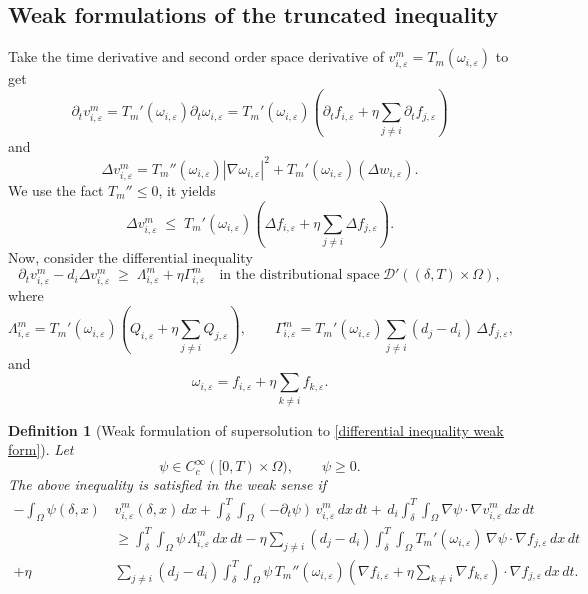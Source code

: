 \documentclass[a4paper,12pt,reqno]{amsart}
\theoremstyle{plain}
\newtheorem{defn}[thm]{Definition}
\numberwithin{equation}{section}
\begin{document}
	\subsection{Weak formulations of the truncated inequality}
	Take the time derivative and second order space derivative of $	v^m_{i,\varepsilon} = T_m(\omega_{i,\varepsilon})$ to get 
	\[
	\partial_t v^m_{i,\varepsilon}=
	T_m'(\omega_{i,\varepsilon}) \partial_t \omega_{i,\varepsilon}
	= T_m'(\omega_{i,\varepsilon})
	\left( 
	\partial_t f_{i,\varepsilon}
	+ \eta \sum_{j\ne i} \partial_t f_{j,\varepsilon}
	\right)
	\]
	and
	\[
	\Delta v^m_{i,\varepsilon}
	= T_m''(\omega_{i,\varepsilon})
	\left| 
	\nabla \omega_{i,\varepsilon}
	\right|^2
	+ T_m'(\omega_{i,\varepsilon})
	\left( 
	\Delta w_{i,\varepsilon}
	\right).
	\]
	We use the fact $T_m''\le 0$, it yields
	\[
	\Delta v^m_{i,\varepsilon}
	\;\le\;
	T_m'(\omega_{i,\varepsilon})
	\left( 
	\Delta f_{i,\varepsilon}
	+ \eta \sum_{j\ne i} \Delta f_{j,\varepsilon}
	\right).
	\]
	Now, consider the differential inequality
	\[
	\partial_t v^m_{i,\varepsilon}
	- d_i \Delta v^m_{i,\varepsilon}
	\;\ge\;
	\Lambda^m_{i,\varepsilon}
	+
	\eta\Gamma^m_{i,\varepsilon}
	\quad \text{in the distributional space}\  \mathcal{D}'((\delta,T)\times\Omega),
	\]
	where
	\[
	\Lambda^m_{i,\varepsilon}
	=
	T_m'(\omega_{i,\varepsilon})
	\left(
	Q_{i,\varepsilon}
	+ \eta \sum_{j\ne i} Q_{j,\varepsilon}
	\right),
	\qquad
	\Gamma^{m}_{i,\varepsilon}
	=
	T_m'(\omega_{i,\varepsilon})
	\sum_{j\ne i} (d_j - d_i)\, \Delta f_{j,\varepsilon},
	\]
	and
	\[
	\omega_{i,\varepsilon}
	=
	f_{i,\varepsilon}
	+
	\eta \sum_{k\ne i} f_{k,\varepsilon}.
	\]
	\begin{defn}[Weak formulation of supersolution to \eqref{differential inequality weak form}]
		Let 
		\[
		\psi \in C_c^\infty([0,T)\times\Omega),
		\qquad \psi \ge 0 .
		\]
		The above inequality is satisfied in the weak sense if
		\begin{align}
			\label{eq:WF1}
			- \int_{\Omega} \psi(\delta,x)\, &v^{m}_{i,\varepsilon}(\delta,x)\, dx
			+\int_{\delta}^{T} \int_{\Omega}
			(-\partial_t \psi)\, v^{m}_{i,\varepsilon}\, dx\, dt
			\nonumber+\, d_i \int_{\delta}^{T} \int_{\Omega}
			\nabla \psi \cdot \nabla v^{m}_{i,\varepsilon}\, dx\, dt
			\nonumber\\
			&\ge
			\int_{\delta}^{T} \int_{\Omega}
			\psi\, \Lambda^{m}_{i,\varepsilon}\, dx\, dt
			-\eta \sum_{j\ne i} (d_j - d_i)
			\int_{\delta}^{T} \int_{\Omega}
			T_m'(\omega_{i,\varepsilon})
			\,\nabla \psi \cdot \nabla f_{j,\varepsilon}
			\, dx\, dt
			\nonumber\\
			+\eta& \sum_{j\ne i} (d_j - d_i)
			\int_{\delta}^{T} \int_{\Omega}
			\psi\, T_m''(\omega_{i,\varepsilon})
			\left(
			\nabla f_{i,\varepsilon}
			+
			\eta \sum_{k\ne i} \nabla f_{k,\varepsilon}
			\right)
			\cdot \nabla f_{j,\varepsilon}
			\, dx\, dt .
		\end{align}
	\end{defn}
	\medskip
	
\end{document}
